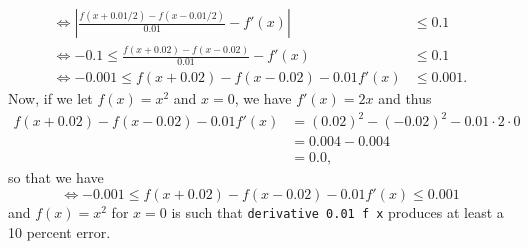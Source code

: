 \documentclass{article}
\begin{document}
\begin{itemize}
\begin{equation*}
\begin{split}
            \Leftrightarrow \left| \frac{f(x + 0.01/2) - f(x - 0.01/2)}{0.01} - f'(x) \right| 
            &\leq 0.1 \\
            \Leftrightarrow -0.1 \leq \frac{f(x + 0.02) - f(x - 0.02)}{0.01} - f'(x) 
            &\leq 0.1 \\
            \Leftrightarrow -0.001 \leq f(x + 0.02) - f(x - 0.02) - 0.01f'(x) &\leq 0.001.
        \end{split}
    \end{equation*}
    \qquad Now, if we let $f(x) = x^2$ and $x = 0$, we have $f'(x) = 2x$ and thus
    \begin{equation*}
        \begin{split}
            f(x + 0.02) - f(x - 0.02) - 0.01f'(x)
            &= {(0.02)}^2 - (-0.02)^2 - 0.01\cdot2\cdot0 \\
            &= 0.004 - 0.004 \\
            &= 0.0,
        \end{split}
    \end{equation*}
    so that we have
    \[
        \Leftrightarrow -0.001 \leq f(x + 0.02) - f(x - 0.02) - 0.01f'(x) \leq 0.001
    \]
    and $f(x) = x^2$ for $x = 0$ is such that \verb|derivative 0.01 f x| produces at least a 
    10 percent error.
\end{itemize}
\end{document}
